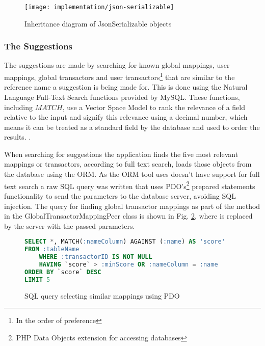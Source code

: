 \begin{figure}[h]
    \centering
    \texttt{[image: implementation/json-serializable]}
    \caption{Inheritance diagram of JsonSerializable objects}
    \label{fig:mapping-inheritance-diagram}
    
    \begin{comment}
[<<Interface>> JsonSerializable]^-[<<Abstract>> Transactor]
[<<Interface>> JsonSerializable]^-[<<Abstract>> TransactorMapping]
[<<Interface>> JsonSerializable]^-[Transaction]
[<<Abstract>> TransactorMapping]^-[UserTransactorMapping]
[<<Abstract>> TransactorMapping]^-[GlobalTransactorMapping]
[<<Abstract>> Transactor]^-[UserTransactor]
[<<Abstract>> Transactor]^-[GlobalTransactor]
    \end{comment}
\end{figure}

\subsubsection{The Suggestions} \label{sec:suggestionimplementation}
The suggestions are made by searching for known global mappings, user mappings, global transactors and user transactors\footnote{In the order of preference} that are similar to the reference name a suggestion is being made for. This is done using the Natural Language Full-Text Search functions provided by MySQL. These functions, including \inlinesql$MATCH$, use a Vector Space Model to rank the relevance of a field relative to the input and signify this relevance using a decimal number, which means it can be treated as a standard field by the database and used to order the results.  \parencite{mysql2014searches}. 

When searching for suggestions the application finds the five most relevant mappings or transactors, according to full text search, loads those objects from the database using the ORM. As the ORM tool uses doesn't have support for full text search a raw SQL query was written that uses PDO's\footnote{PHP Data Objects extension for accessing databases} prepared statements functionality to send the parameters to the database server, avoiding SQL injection. The query for finding global transactor mappings as part of the  method in the GlobalTransactorMappingPeer class is shown in Fig. \ref{fig:sql-match-query}, where  is replaced by the server with the passed parameters.

\begin{figure}
\centering
\lstset{style=phpcolor}
\begin{lstlisting}[language=sql]
SELECT *, MATCH(:nameColumn) AGAINST (:name) AS 'score'
FROM :tableName
	WHERE :transactorID IS NOT NULL
	HAVING `score` > :minScore OR :nameColumn = :name
ORDER BY `score` DESC
LIMIT 5
\end{lstlisting}
\caption{SQL query selecting similar mappings using PDO}
\label{fig:sql-match-query}
\end{figure}


